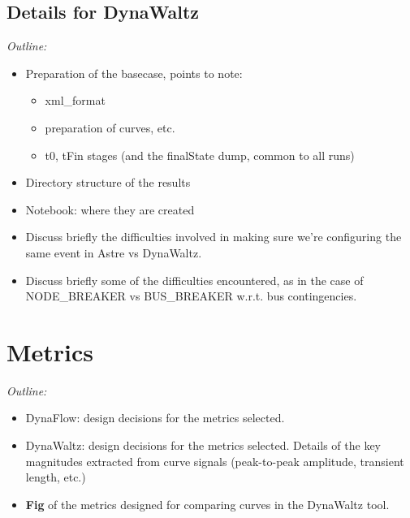 \documentclass[conference]{IEEEtran}
\begin{document}
\subsection{Details for DynaWaltz}
\begin{center}
  \itshape
  Outline:
  \begin{itemize}
    \item Preparation of the basecase, points to note:
          \begin{itemize}
            \item xml\_format
            \item preparation of curves, etc.
            \item t0, tFin stages (and the finalState dump, common to all runs)
          \end{itemize}
    \item Directory structure of the results
    \item Notebook: where they are created
    \item Discuss briefly the difficulties involved in making sure we're
          configuring the same event in Astre vs DynaWaltz.
    \item Discuss briefly some of the difficulties encountered, as in the
          case of NODE\_BREAKER vs BUS\_BREAKER w.r.t. bus contingencies.
  \end{itemize}
\end{center}



\section{Metrics}
\begin{center}
  \itshape
  Outline:
  \begin{itemize}
    \item DynaFlow: design decisions for the metrics selected.
    \item DynaWaltz: design decisions for the metrics selected. Details of
          the key magnitudes extracted from curve signals (peak-to-peak
          amplitude, transient length, etc.)
    \item \textbf{Fig} of the metrics designed for comparing curves in the
          DynaWaltz tool.
  \end{itemize}
\end{center}
\end{document}
